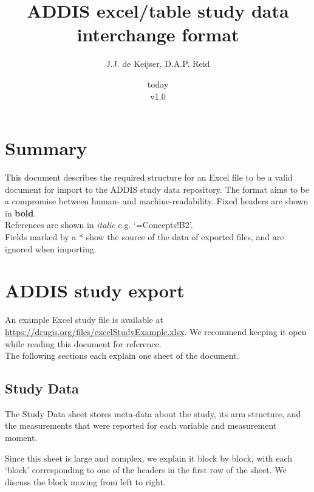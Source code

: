 \documentclass[a4paper,10pt]{article}
\title{ADDIS excel/table study data interchange format}
\author{J.J. de Keijser, D.A.P. Reid}
\date{today\\v1.0}
\begin{document}
\maketitle
\section{Summary}

This document describes the required structure for an Excel file to be a valid document for import to the ADDIS study data repository. The format aims to be a compromise between human- and machine-readability.
Fixed headers are shown in \textbf{bold}.\\
References are shown in \textit{italic} e.g. `=Concepts!B2'.\\
Fields marked by a * show the source of the data of exported files, and are ignored when importing.

\section{ADDIS study export}
An example Excel study file is available at \url{https://drugis.org/files/excelStudyExample.xlsx}. We recommend keeping it open while reading this document for reference.\\ 
The following sections each explain one sheet of the document.

\subsection{Study Data}
The Study Data sheet stores meta-data about the study, its arm structure, and the measurements that were reported for each variable and measurement moment.

Since this sheet is large and complex, we explain it block by block, with each `block' corresponding to one of the headers in the first row of the sheet. We discuss the block moving from left to right.
\end{document}
